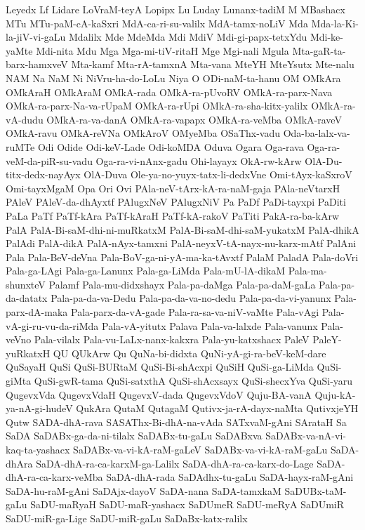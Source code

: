 {Leyedx
Lf
Lidare
LoVraM-teyA
Lopipx
Lu
Luday
Lunanx-tadiM
M
MBashacx
MTu
MTu-paM-cA-kaSxri
MdA-ca-ri-su-valilx
MdA-tamx-noLiV
Mda
Mda-la-Ki-la-jiV-vi-gaLu
Mdalilx
Mde
MdeMda
Mdi
MdiV
Mdi-gi-papx-tetxYdu
Mdi-ke-yaMte
Mdi-nita
Mdu
Mga
Mga-mi-tiV-ritaH
Mge
Mgi-nali
Mgula
Mta-gaR-ta-barx-hamxveV
Mta-kamf
Mta-rA-tamxnA
Mta-vana
MteYH
MteYsutx
Mte-nalu
NAM
Na
NaM
Ni
NiVru-ha-do-LoLu
Niya
O
ODi-naM-ta-hanu
OM
OMkAra
OMkAraH
OMkAraM
OMkA-rada
OMkA-ra-pUvoRV
OMkA-ra-parx-Nava
OMkA-ra-parx-Na-va-rUpaM
OMkA-ra-rUpi
OMkA-ra-sha-kitx-yalilx
OMkA-ra-vA-dudu
OMkA-ra-va-danA
OMkA-ra-vapapx
OMkA-ra-veMba
OMkA-raveV
OMkA-ravu
OMkA-reVNa
OMkAroV
OMyeMba
OSaThx-vadu
Oda-ba-lalx-va-ruMTe
Odi
Odide
Odi-keV-Lade
Odi-koMDA
Oduva
Ogara
Oga-rava
Oga-ra-veM-da-piR-su-vadu
Oga-ra-vi-nAnx-gadu
Ohi-layayx
OkA-rw-kArw
OlA-Du-titx-dedx-nayAyx
OlA-Duva
Ole-ya-no-yuyx-tatx-li-dedxVne
Omi-tAyx-kaSxroV
Omi-tayxMgaM
Opa
Ori
Ovi
PAla-neV-tArx-kA-ra-naM-gaja
PAla-neVtarxH
PAleV
PAleV-da-dhAyxtf
PAlugxNeV
PAlugxNiV
Pa
PaDf
PaDi-tayxpi
PaDiti
PaLa
PaTf
PaTf-kAra
PaTf-kAraH
PaTf-kA-rakoV
PaTiti
PakA-ra-ba-kArw
PalA
PalA-Bi-saM-dhi-ni-muRkatxM
PalA-Bi-saM-dhi-saM-yukatxM
PalA-dhikA
PalAdi
PalA-dikA
PalA-nAyx-tamxni
PalA-neyxV-tA-nayx-nu-karx-mAtf
PalAni
Pala
Pala-BeV-deVna
Pala-BoV-ga-ni-yA-ma-ka-tAvxtf
PalaM
PaladA
Pala-doVri
Pala-ga-LAgi
Pala-ga-Lanunx
Pala-ga-LiMda
Pala-mU-lA-dikaM
Pala-ma-shunxteV
Palamf
Pala-mu-didxshayx
Pala-pa-daMga
Pala-pa-daM-gaLa
Pala-pa-da-datatx
Pala-pa-da-va-Dedu
Pala-pa-da-va-no-dedu
Pala-pa-da-vi-yanunx
Pala-parx-dA-maka
Pala-parx-da-vA-gade
Pala-ra-sa-va-niV-vaMte
Pala-vAgi
Pala-vA-gi-ru-vu-da-riMda
Pala-vA-yitutx
Palava
Pala-va-lalxde
Pala-vanunx
Pala-veVno
Pala-vilalx
Pala-vu-LaLx-nanx-kakxra
Pala-yu-katxshacx
PaleV
PaleY-yuRkatxH
QU
QUkArw
Qu
QuNa-bi-didxta
QuNi-yA-gi-ra-beV-keM-dare
QuSayaH
QuSi
QuSi-BURtaM
QuSi-Bi-shAcxpi
QuSiH
QuSi-ga-LiMda
QuSi-giMta
QuSi-gwR-tama
QuSi-satxthA
QuSi-shAcxsayx
QuSi-shecxYva
QuSi-yaru
QugevxVda
QugevxVdaH
QugevxV-dada
QugevxVdoV
Quju-BA-vanA
Quju-kA-ya-nA-gi-hudeV
QukAra
QutaM
QutagaM
Qutivx-ja-rA-dayx-naMta
QutivxjeYH
Qutw
SADA-dhA-rava
SASAThx-Bi-dhA-na-vAda
SATxvaM-gAni
SArataH
Sa
SaDA
SaDABx-ga-da-ni-tilalx
SaDABx-tu-gaLu
SaDABxva
SaDABx-va-nA-vi-kaq-ta-yashacx
SaDABx-va-vi-kA-raM-gaLeV
SaDABx-va-vi-kA-raM-gaLu
SaDA-dhAra
SaDA-dhA-ra-ca-karxM-ga-Lalilx
SaDA-dhA-ra-ca-karx-do-Lage
SaDA-dhA-ra-ca-karx-veMba
SaDA-dhA-rada
SaDAdhx-tu-gaLu
SaDA-hayx-raM-gAni
SaDA-hu-raM-gAni
SaDAjx-dayoV
SaDA-nana
SaDA-tamxkaM
SaDUBx-taM-gaLu
SaDU-maRyaH
SaDU-maR-yashacx
SaDUmeR
SaDU-meRyA
SaDUmiR
SaDU-miR-ga-Lige
SaDU-miR-gaLu
SaDaBx-katx-ralilx
}
